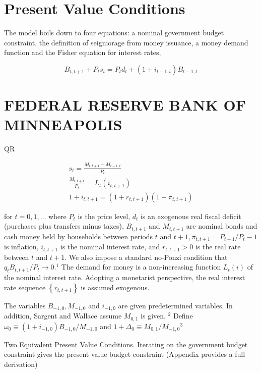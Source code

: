 \documentclass[10pt]{article}
\begin{document}
\section*{Present Value Conditions}
The model boils down to four equations: a nominal government budget constraint, the definition of seigniorage from money issuance, a money demand function and the Fisher equation for interest rates,

\begin{equation*}
B_{t, t+1}+P_{t} s_{t}=P_{t} d_{t}+\left(1+i_{t-1, t}\right) B_{t-1, t}
\end{equation*}

\section*{FEDERAL RESERVE BANK OF MINNEAPOLIS}
QR

\begin{equation*}
\begin{gathered}
s_{t}=\frac{M_{t, t+1}-M_{t-1, t}}{P_{t}} \\
\frac{M_{t, t+1}}{P_{t}}=L_{t}\left(i_{t, t+1}\right) \\
1+i_{t, t+1}=\left(1+r_{t, t+1}\right)\left(1+\pi_{t, t+1}\right)
\end{gathered}
\end{equation*}

for $t=0,1, \ldots$ where $P_{t}$ is the price level, $d_{t}$ is an exogenous real fiscal deficit (purchases plus transfers minus taxes), $B_{t, t+1}$ and $M_{t, t+1}$ are nominal bonds and cash money held by households between periods $t$ and $t+1, \pi_{t, t+1}=P_{t+1} / P_{t}-1$ is inflation, $i_{t, t+1}$ is the nominal interest rate, and $r_{t, t+1}>0$ is the real rate between $t$ and $t+1$. We also impose a standard no-Ponzi condition that $q_{t} B_{t, t+1} / P_{t} \rightarrow 0 .{ }^{1}$ The demand for money is a non-increasing function $L_{t}(i)$ of the nominal interest rate. Adopting a monetarist perspective, the real interest rate sequence $\left\{r_{t, t+1}\right\}$ is assumed exogenous.

The variables $B_{-1,0}, M_{-1,0}$ and $i_{-1,0}$ are given predetermined variables. In addition, Sargent and Wallace assume $M_{0,1}$ is given. ${ }^{2}$ Define $\omega_{0} \equiv\left(1+i_{-1,0}\right) B_{-1,0} / M_{-1,0}$ and $1+\Delta_{0} \equiv M_{0,1} / M_{-1,0}{ }^{3}$

Two Equivalent Present Value Conditions. Iterating on the government budget constraint gives the present value budget constraint (Appendix provides a full derivation)
\end{document}
